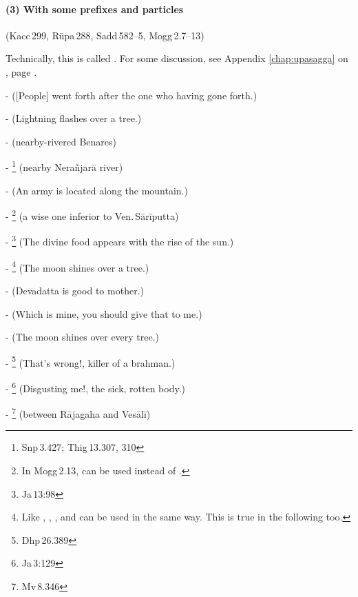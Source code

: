\paragraph*{(3) With some prefixes and particles} (Kacc\,299, R\=upa\,288, Sadd\,582--5, Mogg\,2.7--13)\par
Technically, this is called . For some discussion, see Appendix \ref{chap:upasagga} on , page \pageref{upasagga:anu}.\par
-  ([People] went forth after the one who having gone forth.)\par
-  (Lightning flashes over a tree.)\par
-  (nearby-rivered Benares)\par
- \footnote{Snp\,3.427; Thig\,13.307, 310} (nearby Nera\~njar\=a river)\par
-  (An army is located along the mountain.)\par
- \footnote{In Mogg\,2.13,  can be used instead of .} (a wise one inferior to Ven.\,S\=ar\=iputta)\par
- \footnote{Ja\,13:98} (The divine food appears with the rise of the sun.)\par
- \footnote{Like , , , and  can be used in the same way. This is true in the following too.} (The moon shines over a tree.)\par
-  (Devadatta is good to mother.)\par
-  (Which is mine, you should give that to me.)\par
-  (The moon shines over every tree.)\par
- \footnote{Dhp\,26.389} (That's wrong!, killer of a brahman.)\par
- \footnote{Ja\,3:129} (Disgusting me!, the sick, rotten body.)\par
- \footnote{Mv\,8.346} (between R\=ajagaha and Ves\=al\=i)\par

